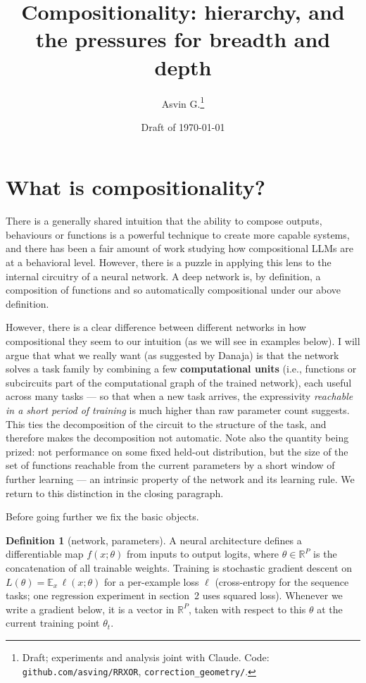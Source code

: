 \documentclass[10pt]{article}
\title{Compositionality: hierarchy, and the pressures for breadth and depth}
\author{Asvin G.\thanks{Draft; experiments and analysis joint with Claude. Code: \texttt{github.com/asving/RRXOR}, \texttt{correction\_geometry/}.}}
\date{Draft of \today}
\theoremstyle{definition}
\newtheorem{definition}{Definition}
\begin{document}
\maketitle

\section{What is compositionality?}

There is a generally shared intuition that the ability to compose outputs, behaviours or functions is a powerful technique to create more capable systems, and there has been a fair amount of work studying how compositional LLMs are at a behavioral level. However, there is a puzzle in applying this lens to the internal circuitry of a neural network. A deep network is, by definition, a composition of functions and so automatically compositional under our above definition.

However, there is a clear difference between different networks in how compositional they seem to our intuition (as we will see in examples below). I will argue that what we really want (as suggested by Danaja) is that the network solves a task family by combining a few \textbf{computational units} (i.e., functions or subcircuits part of the computational graph of the trained network), each useful across many tasks --- so that when a new task arrives, the expressivity \emph{reachable in a short period of training} is much higher than raw parameter count suggests. This ties the decomposition of the circuit to the structure of the task, and therefore makes the decomposition not automatic. Note also the quantity being prized: not performance on some fixed held-out distribution, but the size of the set of functions reachable from the current parameters by a short window of further learning --- an intrinsic property of the network and its learning rule. We return to this distinction in the closing paragraph.

Before going further we fix the basic objects.

\begin{definition}[network, parameters]
A neural architecture defines a differentiable map $f(x;\theta)$ from inputs to output logits, where $\theta \in \mathbb{R}^P$ is the concatenation of all trainable weights. Training is stochastic gradient descent on $L(\theta) = \mathbb{E}_x\, \ell(x;\theta)$ for a per-example loss $\ell$ (cross-entropy for the sequence tasks; one regression experiment in section~2 uses squared loss). Whenever we write a gradient below, it is a vector in $\mathbb{R}^P$, taken with respect to this $\theta$ at the current training point $\theta_t$.
\end{definition}
\end{document}
